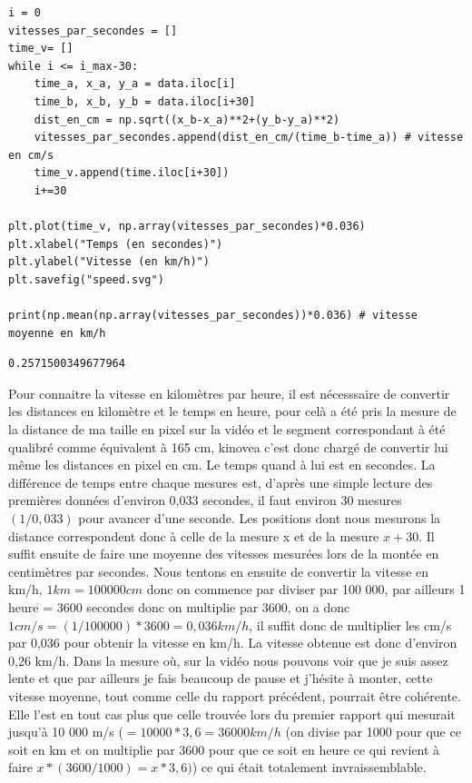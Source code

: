 \documentclass[11pt]{article}
\begin{document}
\begin{verbatim}
i = 0
vitesses_par_secondes = []
time_v= []
while i <= i_max-30:
    time_a, x_a, y_a = data.iloc[i]
    time_b, x_b, y_b = data.iloc[i+30]
    dist_en_cm = np.sqrt((x_b-x_a)**2+(y_b-y_a)**2)
    vitesses_par_secondes.append(dist_en_cm/(time_b-time_a)) # vitesse en cm/s
    time_v.append(time.iloc[i+30])
    i+=30

plt.plot(time_v, np.array(vitesses_par_secondes)*0.036)
plt.xlabel("Temps (en secondes)")
plt.ylabel("Vitesse (en km/h)")
plt.savefig("speed.svg")

print(np.mean(np.array(vitesses_par_secondes))*0.036) # vitesse moyenne en km/h
\end{verbatim}

\label{orgb7313bf}
\begin{verbatim}
0.2571500349677964
\end{verbatim}


Pour connaitre la vitesse en kilomètres par heure, il est nécesssaire de convertir les distances en kilomètre et le temps en heure, pour celà a été pris
la mesure de la distance de ma taille en pixel sur la vidéo et le segment correspondant à été qualibré comme équivalent à 165 cm, kinovea c'est donc
chargé de convertir lui même les distances en pixel en cm. Le temps quand à lui est en secondes. La différence de temps entre chaque mesures est,
d'après une simple lecture des premières données d'environ 0,033 secondes, il faut environ 30 mesures \((1/0,033)\) pour avancer d'une seconde. Les
positions dont nous mesurons la distance correspondent donc à celle de la mesure x et de la mesure \(x+30\). Il suffit ensuite de faire une moyenne
des vitesses mesurées lors de la montée en centimètres par secondes. Nous tentons en ensuite de convertir la vitesse en km/h, \(1 km = 100 000 cm\) donc on
commence par diviser par 100 000, par ailleurs 1 heure = 3600 secondes donc on multiplie par 3600, on a donc \(1 cm/s = (1/100 000)*3600 = 0,036 km/h\), il
suffit donc de multiplier les cm/s par 0,036 pour obtenir la vitesse en km/h. La vitesse obtenue est donc d'environ 0,26 km/h. Dans la mesure où, sur la
vidéo nous pouvons voir que je suis assez lente et que par ailleurs je fais beaucoup de pause et j'hésite à monter, cette vitesse moyenne, tout comme celle
du rapport précédent, pourrait être cohérente. Elle l'est en tout cas plus que celle trouvée lors du premier rapport qui mesurait jusqu'à 10 000 m/s
(\(= 10 000*3,6 = 36 000 km/h\) (on divise par 1000 pour que ce soit en km et on multiplie par 3600 pour que ce soit en heure ce qui revient à faire
\(x*(3600/1000)=x*3,6)\)) ce qui était totalement invraissemblable.
\end{document}
